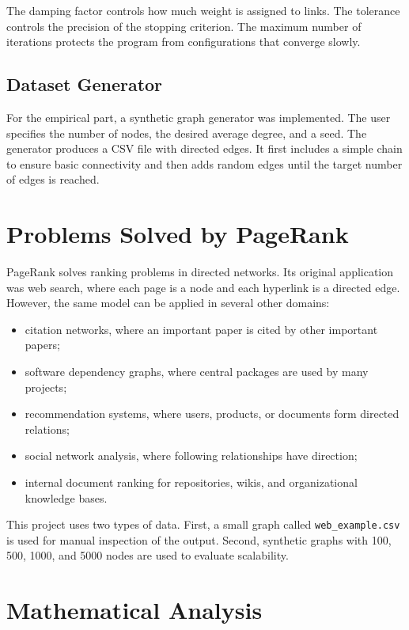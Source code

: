 \documentclass[runningheads]{llncs}
\begin{document}
The damping factor controls how much weight is assigned to links. The tolerance controls the precision of the stopping criterion. The maximum number of iterations protects the program from configurations that converge slowly.

\subsection{Dataset Generator}

For the empirical part, a synthetic graph generator was implemented. The user specifies the number of nodes, the desired average degree, and a seed. The generator produces a CSV file with directed edges. It first includes a simple chain to ensure basic connectivity and then adds random edges until the target number of edges is reached.

\section{Problems Solved by PageRank}

PageRank solves ranking problems in directed networks. Its original application was web search, where each page is a node and each hyperlink is a directed edge. However, the same model can be applied in several other domains:

\begin{itemize}
\item citation networks, where an important paper is cited by other important papers;
\item software dependency graphs, where central packages are used by many projects;
\item recommendation systems, where users, products, or documents form directed relations;
\item social network analysis, where following relationships have direction;
\item internal document ranking for repositories, wikis, and organizational knowledge bases.
\end{itemize}

This project uses two types of data. First, a small graph called \texttt{web\_example.csv} is used for manual inspection of the output. Second, synthetic graphs with 100, 500, 1000, and 5000 nodes are used to evaluate scalability.

\section{Mathematical Analysis}
\end{document}

